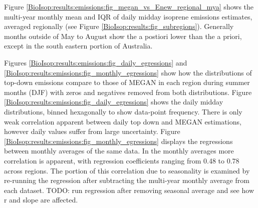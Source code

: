     
    Figure \ref{BioIsop:results:emissions:fig_megan_vs_Enew_regional_mya} shows the multi-year monthly mean and IQR of daily midday isoprene emissions estimates, averaged regionally (see Figure \ref{BioIsop:results:fig_subregions}). 
    Generally months outside of May to August show the a postiori lower than the a priori, except in the south eastern portion of Australia.
    
    
    Figures \ref{BioIsop:results:emissions:fig_daily_egressions} and \ref{BioIsop:results:emissions:fig_monthly_egressions} show how the distributions of top-down emissions compare to those of MEGAN in each region during summer months (DJF) with zeros and negatives removed from both distributions. 
    Figure \ref{BioIsop:results:emissions:fig_daily_egressions} shows the daily midday distributions, binned hexagonally to show data-point frequency.
    There is only weak correlation apparent between daily top down and MEGAN estimations, however daily values suffer from large uncertainty. 
    Figure \ref{BioIsop:results:emissions:fig_monthly_egressions} displays the regressions between monthly averages of the same data. 
    In the monthly averages more correlation is apparent, with regression coefficients ranging from 0.48 to 0.78 across regions.
    The portion of this correlation due to seasonality is examined by re-running the regression after subtracting the multi-year monthly average from each dataset.
    TODO: run regression after removing seasonal average and see how r and slope are affected.
    
